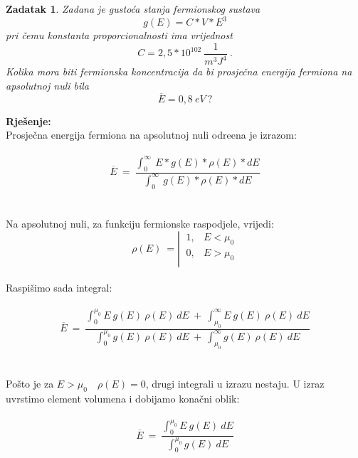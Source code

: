 \documentclass[a4paper,12pt]{article}
\newtheorem{ZDK}{Zadatak}[section]
\begin{document}
\newpage
\begin{ZDK}
	Zadana je gusto\'ca stanja fermionskog sustava
	$$ g(E)=C*V*E^3 $$
	pri \v{c}emu konstanta proporcionalnosti ima vrijednost 
	$$ C=2,5*10^{102}\ \frac{1}{m^3 J^4}\ . $$
	Kolika mora biti fermionska koncentracija da bi prosje\v{c}na energija fermiona na apsolutnoj nuli bila 
	$$ \overline{E}=0,8\ eV\ ? $$
\end{ZDK}
\textbf{Rje\v{s}enje:} \\
\newline
Prosje\v{c}na energija fermiona na apsolutnoj nuli odre\dj ena je izrazom:
\\
\\
$$ \overline{E}\ =\ \frac{\int_{0}^{\infty}\ E*g(E)*\rho(E)*dE}{\int_{0}^{\infty}\ g(E)*\rho(E)*dE} $$
\\
\\
Na apsolutnoj nuli, za funkciju fermionske raspodjele, vrijedi:
\begin{equation*}
	\rho(E)\ =\left|\  
	\begin{matrix}
		1, & E<\mu_0 \\
		0, & E>\mu_0 \\
	\end{matrix}
\end{equation*}
\\
Raspi\v{s}imo sada integral:
\\
\\
$$ \overline{E}\ =\ \frac{\int_{0}^{\mu_0} E\ g(E)\ \rho(E)\ dE\ +\ \int_{\mu_0}^{\infty} E\ g(E)\ \rho(E)\ dE}
{\int_{0}^{\mu_0} g(E)\ \rho(E)\ dE\ +\ \int_{\mu_0}^{\infty} g(E)\ \rho(E)\ dE} $$
\\
\\
Po\v{s}to je za $E>\mu_0 \quad \rho(E)=0$, drugi integrali u izrazu nestaju. U izraz uvrstimo element volumena i dobijamo kona\v{c}ni oblik:
\\
\\
$$ \overline{E}\ =\ \frac{\int_{0}^{\mu_0} E\ g(E)\ dE}{\int_{0}^{\mu_0} g(E)\ dE} $$
\end{document}
